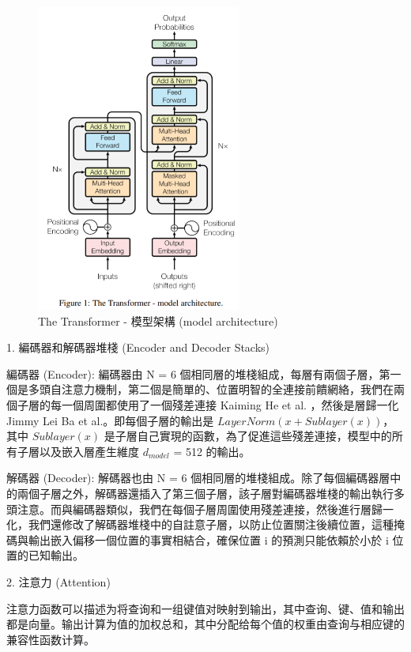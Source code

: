\begin{figure}[htb]
\centering 
\includegraphics[width=0.6\textwidth]{img/tm1.png} 
\caption{The Transformer - 模型架構 (model architecture)}
\label{Test}
\end{figure}

1. 編碼器和解碼器堆棧 (Encoder and Decoder Stacks)

編碼器 (Encoder): 編碼器由 N = 6 個相同層的堆棧組成，每層有兩個子層，第一個是多頭自注意力機制，第二個是簡單的、位置明智的全連接前饋網絡，我們在兩個子層的每一個周圍都使用了一個殘差連接 Kaiming He et al. ，然後是層歸一化 Jimmy Lei Ba et al.。即每個子層的輸出是 $LayerNorm(x + Sublayer(x))$，其中 $Sublayer(x)$ 是子層自己實現的函數，為了促進這些殘差連接，模型中的所有子層以及嵌入層產生維度 $d_{model}$ = 512 的輸出。

解碼器 (Decoder): 解碼器也由 N = 6 個相同層的堆棧組成。除了每個編碼器層中的兩個子層之外，解碼器還插入了第三個子層，該子層對編碼器堆棧的輸出執行多頭注意。而與編碼器類似，我們在每個子層周圍使用殘差連接，然後進行層歸一化，我們還修改了解碼器堆棧中的自註意子層，以防止位置關注後續位置，這種掩碼與輸出嵌入偏移一個位置的事實相結合，確保位置 i 的預測只能依賴於小於 i 位置的已知輸出。

2. 注意力 (Attention)

注意力函数可以描述为将查询和一组键值对映射到输出，其中查询、键、值和输出都是向量。输出计算为值的加权总和，其中分配给每个值的权重由查询与相应键的兼容性函数计算。


